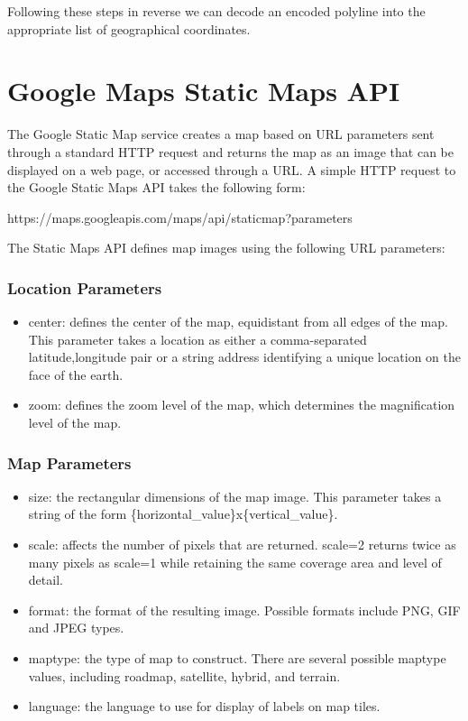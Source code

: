 Following these steps in reverse we can decode an encoded polyline into the appropriate list of geographical coordinates. 

\section{Google Maps Static Maps API}

The Google Static Map service \cite{18} creates a map based on URL parameters sent through a standard HTTP request and returns the map as an image 
that can be displayed on a web page, or accessed through a URL. A simple HTTP request to the Google Static Maps API takes the following form:

\begin{center}
 https://maps.googleapis.com/maps/api/staticmap?parameters
\end{center}

The Static Maps API defines map images using the following URL parameters:

\subsubsection{Location Parameters}

\begin{itemize}
 \item center: defines the center of the map, equidistant from all edges of the map. This parameter takes a location as either a comma-separated {latitude,longitude} 
 pair or a string address identifying a unique location on the face of the earth.
 \item zoom: defines the zoom level of the map, which determines the magnification level of the map. 
\end{itemize}

\subsubsection{Map Parameters}

\begin{itemize}
 \item size: the rectangular dimensions of the map image. This parameter takes a string of the form \{horizontal\_value\}x\{vertical\_value\}. 
 \item scale: affects the number of pixels that are returned. scale=2 returns twice as many pixels as scale=1 while retaining the same coverage area and level of detail.
 \item format: the format of the resulting image. Possible formats include PNG, GIF and JPEG types.
 \item maptype: the type of map to construct. There are several possible maptype values, including roadmap, satellite, hybrid, and terrain. 
 \item language: the language to use for display of labels on map tiles.
\end{itemize}

